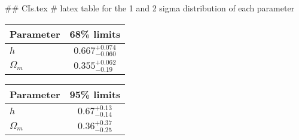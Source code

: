 ## CIs.tex
# latex table for the 1 and 2 sigma distribution of each parameter

\begin{tabular} { l  c}
 Parameter &  68\% limits\\
\hline
{\boldmath$h              $} & $0.667^{+0.074}_{-0.060}   $\\
{\boldmath$\Omega_m       $} & $0.355^{+0.062}_{-0.19}    $\\
\hline
\end{tabular}

\begin{tabular} { l  c}
 Parameter &  95\% limits\\
\hline
{\boldmath$h              $} & $0.67^{+0.13}_{-0.14}      $\\
{\boldmath$\Omega_m       $} & $0.36^{+0.37}_{-0.25}      $\\
\hline
\end{tabular}
